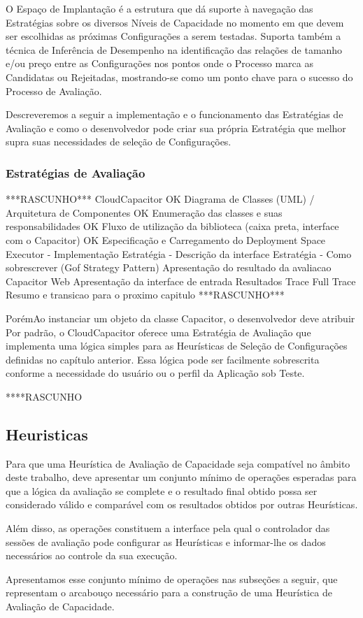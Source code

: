 O Espaço de Implantação é a estrutura que dá suporte à navegação das Estratégias
sobre os diversos Níveis de Capacidade no momento em que devem ser escolhidas
as próximas Configurações a serem testadas. Suporta também a técnica de Inferência 
de Desempenho na identificação das relações de tamanho e/ou preço entre as 
Configurações nos pontos onde o Processo marca as Candidatas ou Rejeitadas, 
mostrando-se como um ponto chave para o sucesso do Processo de Avaliação.

Descreveremos a seguir a implementação e o funcionamento das Estratégias de 
Avaliação e como o desenvolvedor pode criar sua própria Estratégia que melhor
supra suas necessidades de seleção de Configurações. 

\subsubsection{Estratégias de Avaliação}
\label{subsubsec:funcionamento_estrategias}

 
***RASCUNHO***
CloudCapacitor
OK  Diagrama de Classes (UML) / Arquitetura de Componentes
OK  Enumeração das classes e suas responsabilidades
OK  Fluxo de utilização da biblioteca (caixa preta, interface com o Capacitor)
OK  Especificação e Carregamento do Deployment Space
  Executor - Implementação
  Estratégia - Descrição da interface
  Estratégia - Como sobrescrever (Gof Strategy Pattern)
  Apresentação do resultado da avaliacao
Capacitor Web
  Apresentação da interface de entrada
  Resultados
  Trace
  Full Trace
Resumo e transicao para o proximo capitulo
***RASCUNHO***



PorémAo instanciar um objeto da classe Capacitor, o desenvolvedor deve atribuir  
Por padrão, o CloudCapacitor oferece uma Estratégia de Avaliação que implementa 
uma lógica simples para as Heurísticas de Seleção de Configurações definidas no
capítulo anterior. Essa lógica pode ser facilmente sobrescrita conforme a necessidade
do usuário ou o perfil da Aplicação sob Teste.


****RASCUNHO
\subsection{Heuristicas}
Para que uma Heurística de Avaliação de Capacidade seja compatível no âmbito deste trabalho, 
deve apresentar um conjunto mínimo de operações esperadas para que a lógica da
avaliação se complete e o resultado final obtido possa ser considerado válido e
comparável com os resultados obtidos por outras Heurísticas.

Além disso, as operações constituem a interface pela qual o controlador das 
sessões de avaliação pode configurar as Heurísticas e informar-lhe os dados 
necessários ao controle da sua execução.
 
Apresentamos esse conjunto mínimo de operações nas subseções a seguir, que 
representam o arcabouço necessário para a construção de uma Heurística de 
Avaliação de Capacidade.
 
